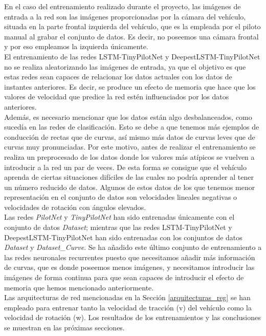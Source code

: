 En el caso del entrenamiento realizado durante el proyecto, las imágenes de entrada a la red son las imágenes proporcionadas por la cámara del vehículo, situada en la parte frontal izquierda del vehículo, que es la empleada por el piloto manual al grabar el conjunto de datos. Es decir, no poseemos una cámara frontal y por eso empleamos la izquierda únicamente.\\ 

El entrenamiento de las redes LSTM-TinyPilotNet y DeepestLSTM-TinyPilotNet no se realiza aleatorizando las imágenes de entrada, ya que el objetivo es que estas redes sean capaces de relacionar los datos actuales con los datos de instantes anteriores. Es decir, se produce un efecto de memoria que hace que los valores de velocidad que predice la red estén influenciados por los datos anteriores.\\

Además, es necesario mencionar que los datos están algo desbalanceados, como sucedía en las redes de clasificación. Esto se debe a que tenemos más ejemplos de conducción de rectas que de curvas, así mismo más datos de curvas leves que de curvas muy pronunciadas. Por este motivo, antes de realizar el entrenamiento se realiza un preprocesado de los datos donde los valores más atípicos se vuelven a introducir a la red un par de veces. De esta forma se consigue que el vehículo aprenda de ciertas situaciones difíciles de las cuales no podría aprender al tener un número reducido de datos. Algunos de estos datos de los que tenemos menor representación en el conjunto de datos son velocidades lineales negativas o velocidades de rotación con ángulos elevados.\\

Las redes \textit{PilotNet} y \textit{TinyPilotNet} han sido entrenadas únicamente con el conjunto de datos \textit{Dataset}; mientras que las redes LSTM-TinyPilotNet y DeepestLSTM-TinyPilotNet han sido entrenadas con los conjuntos de datos \textit{Dataset} y \textit{Dataset\_Curve}. Se ha añadido este último conjunto de entrenamiento a las redes neuronales recurrentes puesto que necesitamos añadir más información de curvas, que es donde poseemos menos imágenes, y necesitamos introducir las imágenes de forma continua para que sean capaces de introducir el efecto de memoria que hemos mencionado anteriormente.\\

Las arquitecturas de red mencionadas en la Sección \ref{arquitecturas_reg} se han empleado para entrenar tanto la velocidad de tracción (v) del vehículo como la velocidad de rotación (w). Los resultados de los entrenamientos y las conclusiones se muestran en las próximas secciones.\\



